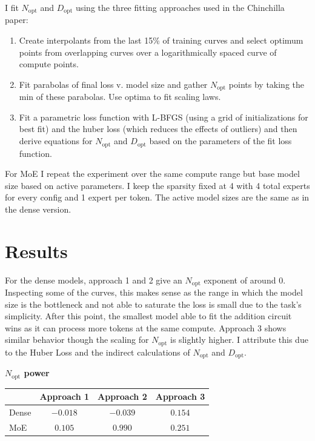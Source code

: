\documentclass[11pt]{article}
\begin{document}
I fit $N_{\text{opt}}$ and $D_{\text{opt}}$ using the three fitting approaches used in the Chinchilla paper:
\begin{enumerate}[label=\arabic*.]
    \item Create interpolants from the last 15\% of training curves and select optimum points from overlapping curves over a logarithmically spaced curve of compute points.
    \item Fit parabolas of final loss v. model size and gather $N_{\text{opt}}$ points by taking the min of these parabolas. Use optima to fit scaling laws.
    \item Fit a parametric loss function with L-BFGS (using a grid of initializations for best fit) and the huber loss (which reduces the effects of outliers) and then derive equations for $N_{\text{opt}}$ and $D_{\text{opt}}$ based on the parameters of the fit loss function.
\end{enumerate}

For MoE I repeat the experiment over the same compute range but base model size based on active parameters. I keep the sparsity fixed at 4 with 4 total experts for every config and 1 expert per token. The active model sizes are the same as in the dense version.

\section*{Results}

For the dense models, approach 1 and 2 give an $N_{\text{opt}}$ exponent of around 0. Inspecting some of the curves, this makes sense as the range in which the model size is the bottleneck and not able to saturate the loss is small due to the task's simplicity. After this point, the smallest model able to fit the addition circuit wins as it can process more tokens at the same compute. Approach 3 shows similar behavior though the scaling for $N_{\text{opt}}$ is slightly higher. I attribute this due to the Huber Loss and the indirect calculations of $N_{\text{opt}}$ and $D_{\text{opt}}$.

\vspace{1.5em}
\begin{center}
    {\large\textbf{$N_{\text{opt}}$ power}} \\[10pt]
    \renewcommand{\arraystretch}{1.35}
    \setlength{\tabcolsep}{14pt}
    \begin{tabular}{lccc}
        \toprule
        & Approach 1 & Approach 2 & Approach 3 \\
        \midrule
        Dense & $-0.018$ & $-0.039$ & $0.154$ \\
        MoE   & $0.105$  & $0.990$  & $0.251$ \\
        \bottomrule
    \end{tabular}
\end{center}
\vspace{1.5em}
\end{document}
